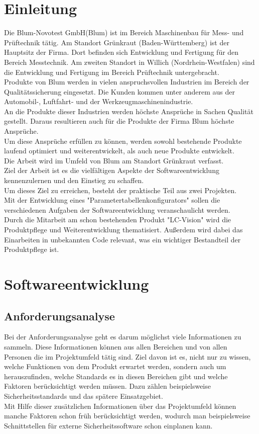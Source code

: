 \documentclass[a4paper,12pt,top=2.5cm,bottom=2.5cm, left=2.5cm, right=2.5cm, numbers=noenddot]{scrartcl}
\begin{document}
\section{Einleitung}
Die Blum-Novotest GmbH(Blum) ist im Bereich Maschinenbau für Mess- und Prüftechnik tätig. Am Standort Grünkraut (Baden-Württemberg) ist der Hauptsitz der Firma. Dort befinden sich Entwicklung und Fertigung für den Bereich Messtechnik. Am zweiten Standort in Willich (Nordrhein-Westfalen) sind die Entwicklung und Fertigung im Bereich Prüftechnik untergebracht.\\
Produkte von Blum werden in vielen anspruchsvollen Industrien im Bereich der Qualitätssicherung eingesetzt. Die Kunden kommen unter anderem aus der Automobil-, Luftfahrt- und der Werkzeugmaschinenindustrie. \\
An die Produkte dieser Industrien werden höchste Ansprüche in Sachen Qualität gestellt. Daraus resultieren auch für die Produkte der Firma Blum höchste Ansprüche. \\
Um diese Ansprüche erfüllen zu können, werden sowohl bestehende Produkte laufend optimiert und weiterentwickelt, als auch neue Produkte entwickelt. \\
Die Arbeit wird im Umfeld von Blum am Standort Grünkraut verfasst. \\
Ziel der Arbeit ist es die vielfältigen Aspekte der Softwareentwicklung kennenzulernen und den Einstieg zu schaffen.\\
Um dieses Ziel zu erreichen, besteht der praktische Teil aus zwei Projekten.\\
Mit der Entwicklung eines "Parametertabellenkonfigurators" sollen die verschiedenen Aufgaben der Softwareentwicklung veranschaulicht werden.\\
Durch die Mitarbeit am schon bestehenden Produkt "LC-Vision" wird die Produktpflege und Weiterentwicklung thematisiert. 
Außerdem wird dabei das Einarbeiten in unbekannten Code relevant, was ein wichtiger Bestandteil der Produktpflege ist.
\newpage   
\section{Softwareentwicklung}
\subsection{Anforderungsanalyse}
Bei der Anforderungsanalyse geht es darum möglichst viele Informationen zu sammeln. Diese Informationen können aus allen Bereichen und von allen Personen die im Projektumfeld tätig sind. Ziel davon ist es, nicht nur zu wissen, welche Funktionen von dem Produkt erwartet werden, sondern auch um herauszufinden, welche Standards es in diesen Bereichen gibt und welche Faktoren berücksichtigt werden müssen. Dazu zählen beispielsweise Sicherheitsstandards und das spätere Einsatzgebiet. 
\\Mit Hilfe dieser zusätzlichen Informationen über das Projektumfeld können manche Faktoren schon früh berücksichtigt werden, wodurch man beispielsweise Schnittstellen für externe Sicherheitssoftware schon einplanen kann.
\end{document}
